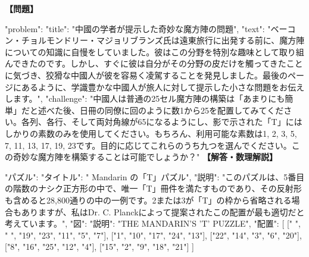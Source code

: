 \documentclass[10pt,a4paper,oneside,openany]{ltjsbook}
\begin{document}
\begin{tcolorbox}[colback=softblue,colframe=primaryblue,title=\textbf{第 410 問：THE MANDARIN'S "T" PUZZLE.},arc=2mm,boxrule=1pt,breakable]
\textbf{【問題】}\par\vspace{0.3em}
{
  "problem": {
    "title": "中國の学者が提示した奇妙な魔方陣の問題",
    "text": "ベーコン・チョルモンドリー・マジョリブランズ氏は遠東旅行に出発する前に、魔方陣についての知識に自慢をしていました。彼はこの分野を特別な趣味として取り組んできたのです。しかし、すぐに彼は自分がその分野の皮だけを觸ってきたことに気づき、狡猾な中國人が彼を容易く凌駕することを発見しました。最後のページにあるように、学識豊かな中國人が旅人に対して提示した小さな問題をお伝えします。",
    "challenge": "中國人は普通の25セル魔方陣の構築は「あまりにも簡単」だと述べた後、日冊の同僚に回のように数1から25を配置してみてください。各列、各行、そして両対角線が65になるようにし、影で示された「T」にはしかりの素数のみを使用してください。もちろん、利用可能な素数は1, 2, 3, 5, 7, 11, 13, 17, 19, 23です。目的に応じてこれらのうち九つを選んでください。この奇妙な魔方陣を構築することは可能でしょうか？"
  }
}
\tcblower
\textbf{【解答・数理解説】}\par\vspace{0.3em}
{
  "パズル": {
    "タイトル": " Mandarin の「T」パズル",
    "説明": "このパズルは、5番目の階数のナシク正方形の中で、唯一「T」冊件を満たすものであり、その反射形も含めると28,800通りの中の一例です。2または3が「T」の枠から省略される場合もありますが、私はDr. C. Planckによって提案されたこの配置が最も適切だと考えています。",
    "図": {
      "説明": "THE MANDARIN'S 'T' PUZZLE",
      "配置": [
        [" ", " ", "19", "23", "11", "5", "7"],
        ["1", "10", "17", "24", "13"],
        ["22", "14", "3", "6", "20"],
        ["8", "16", "25", "12", "4"],
        ["15", "2", "9", "18", "21"]
      ]
    }
  }
}
\end{tcolorbox}
\end{document}
